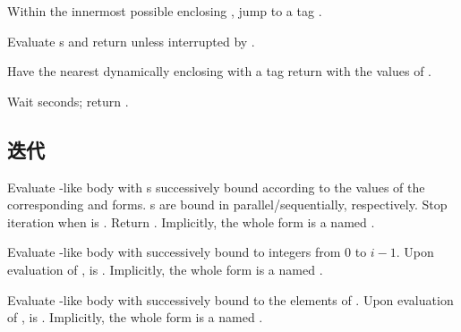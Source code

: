 \begin{LIST}{1cm}
  {
    Within the innermost possible enclosing , jump to a
    tag  .
  }

  {
    Evaluate s and return  unless
    interrupted by . 
  }

  {
    Have the nearest dynamically
    enclosing  with a tag   return with the
    values of .
  }

  {
    Wait  seconds; return \retval{\NIL}.
  }

\end{LIST}


\subsection{迭代}

\begin{LIST}{1cm}
  
  {
    Evaluate -like body with s successively bound
    according to the values of the corresponding  and
     forms. s are bound in parallel/sequentially,
    respectively. Stop iteration when  is \T. Return
    . Implicitly, the whole form
    is a  named \NIL.
  }

  {
    Evaluate -like body with  successively bound
    to integers from 0 to $i - 1$. Upon evaluation of
    ,  is . Implicitly, the whole
    form is a  named \NIL. 
  }

  {
    Evaluate -like body with  successively bound
    to the elements of . Upon evaluation of
    ,  is \NIL. Implicitly, the whole form
    is a  named \NIL. 
  }


\end{LIST}

